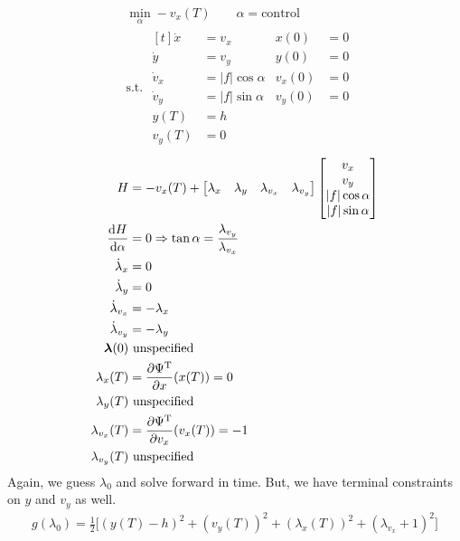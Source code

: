 \begin{align}
  & \min_\alpha -v_x(T) \qquad \alpha=\text{control} \\
  & \text{s.t. } \begin{aligned}[t]
    \dot x &= v_x & x(0) &= 0 \\
    \dot y &= v_y & y(0) &= 0 \\
    \dot v_x &= |f|\cos\alpha & v_x(0) &= 0 \\
    \dot v_y &= |f|\sin\alpha & v_y(0) &= 0 \\
    y(T) &= h \\
    v_y(T) &= 0
  \end{aligned}
\end{align}
\begin{align}
  H &= -v_x(T) + \begin{bmatrix}
    \lambda_x & \lambda_y & \lambda_{v_x} & \lambda_{v_y}
  \end{bmatrix}
                                            \begin{bmatrix}
                                              v_x \\ v_y \\ |f|\cos\alpha \\ |f|\sin\alpha
                                            \end{bmatrix} \\
  \frac{\mathop{}\!\mathrm{d} H}{\mathop{}\!\mathrm{d}\alpha} &= 0 \Rightarrow \tan\alpha = \frac{\lambda_{v_y}}{\lambda_{v_x}} \\
  \dot\lambda_x &= 0 \\
  \dot\lambda_y &= 0 \\
  \dot\lambda_{v_x} &= -\lambda_x \\
  \dot\lambda_{v_y} &= -\lambda_y \\
  \bm\lambda(0) & \text{ unspecified} \\
  \lambda_x(T) &= \frac{\partial \Psi^\text{T}}{\partial x}(x(T)) = 0 \\
  \lambda_y(T) & \text{ unspecified} \\
  \lambda_{v_x}(T) &= \frac{\partial \Psi^\text{T}}{\partial v_x}(v_x(T)) = -1 \\
  \lambda_{v_y}(T) & \text{ unspecified}
\end{align}
Again, we guess $\lambda_0$ and solve forward in time. But, we have terminal constraints on $y$ and $v_y$ as well.
\begin{gather}
  g(\lambda_0) = \frac12 \Big[ (y(T)-h)^2 + (v_y(T))^2 + (\lambda_x(T))^2 + (\lambda_{v_x}+1)^2 \Big]
\end{gather}

